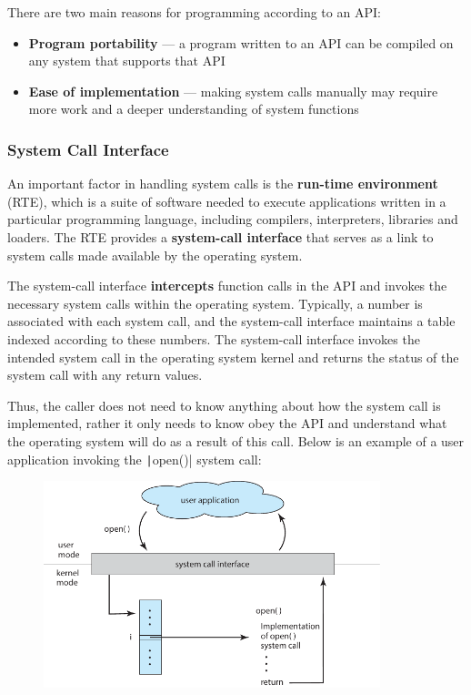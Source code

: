 \documentclass{article}
\begin{document}
There are two main reasons for programming according to an API:\@
\begin{itemize}
    \item \textbf{Program portability} --- a program written to an API
          can be compiled on any system that supports that API
    \item \textbf{Ease of implementation} --- making system
          calls manually may require more work and a deeper
          understanding of system functions
\end{itemize}
\subsubsection{System Call Interface}
An important factor in handling system calls is the \textbf{run-time
environment} (RTE), which is a suite of software needed to execute
applications written in a particular programming language, including
compilers, interpreters, libraries and loaders. The RTE provides a
\textbf{system-call interface} that serves as a link to system calls
made available by the operating system.

The system-call interface \textbf{intercepts} function calls in the API
and invokes the necessary system calls within the operating system.
Typically, a number is associated with each system call, and the
system-call interface maintains a table indexed according to these
numbers. The system-call interface invokes the intended system call in
the operating system kernel and returns the status of the system call
with any return values.

Thus, the caller does not need to know anything about how the system
call is implemented, rather it only needs to know obey the API and
understand what the operating system will do as a result of this call.
Below is an example of a user application invoking the
\texttt|open()| system call:
\begin{figure}[H] \centering
    \includegraphics[height = 6cm]{figures/system_call_open.pdf}
\end{figure}
\end{document}
